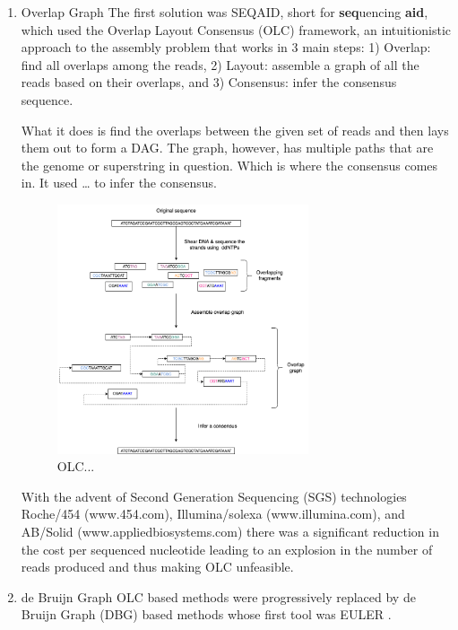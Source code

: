 \documentclass[a4paper]{article}
\begin{document}
\begin{enumerate}
\item Overlap Graph
\label{sec:orgab6bfb3}
The first solution was SEQAID, short for \textbf{seq}uencing \textbf{aid},
\cite{peltolaSEQAIDDNASequence1984} which used the  Overlap Layout Consensus (OLC)
framework, an intuitionistic approach to the assembly problem that works in  
3 main steps: 1) Overlap: find all overlaps among the reads, 2) Layout: assemble
a graph of all the reads based on their overlaps, and 3) Consensus: infer the
consensus sequence.

What it does is find the overlaps between the given set of reads and then lays 
them out to form a DAG. The graph, however, has multiple paths that are the 
genome or superstring in question. Which is where the consensus comes in. 
It used … to infer the consensus.

\begin{figure}[H]
\centering
\includegraphics[width=0.7\textwidth]{figures/OLC framework.png}
\caption{OLC...}
\end{figure}

With the advent of Second Generation Sequencing (SGS) technologies 
Roche/454 (www.454.com), Illumina/solexa (www.illumina.com),
and AB/Solid (www.appliedbiosystems.com) there was a significant reduction in 
the cost per sequenced nucleotide \cite{liComparisonTwoMajor2012} leading to an 
explosion in the number of reads produced and thus making OLC unfeasible. 

\item de Bruijn Graph
\label{sec:orgf168518}
OLC based methods were progressively replaced by de Bruijn Graph (DBG)
\cite{iduryNewAlgorithmDNA1995} based methods whose first tool was EULER
\cite{pevznerEulerianPathApproach2001}.


\end{enumerate}
\end{document}
